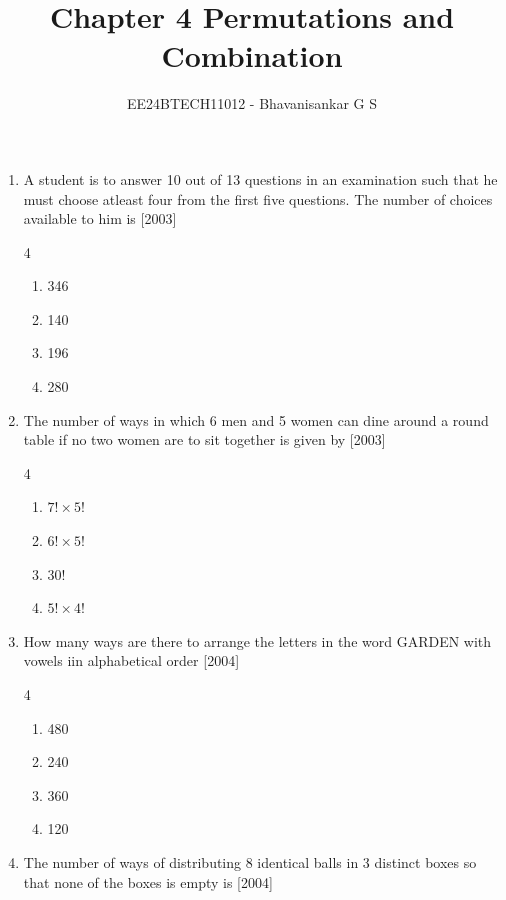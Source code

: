 \documentclass[journal,12pt,twocolumn]{IEEEtran}
\theoremstyle{remark}
\begin{document}

\vspace{3cm}

\title{Chapter 4 Permutations and Combination}
\author{EE24BTECH11012 - Bhavanisankar G S}
\maketitle
\newpage
\bigskip

\renewcommand{\thefigure}{\theenumi}
\renewcommand{\thetable}{\theenumi}
\begin{enumerate}
	\item A student is to answer 10 out of 13 questions in an examination such that he must choose atleast four from the first five questions. The number of choices available to him is  \hfill[2003]	
       \begin{multicols}{4}		
\begin{enumerate} 
    \item  346
    \item  140 
    \item  196
    \item  280
      \end{enumerate}
      \end{multicols}
\item The number of ways in which 6 men and 5 women can dine around a round table if no two women are to sit together is given by \hfill[2003]
	\begin{multicols}{4}	
 \begin{enumerate}
 \item $7!\times5!$
 \item $6!\times 5!$
 \item $30!$
 \item $5!\times4!$
 \end{enumerate}
	\end{multicols}
\item How many ways are there to arrange the letters in the word GARDEN with vowels iin alphabetical order \hfill[2004]
	\begin{multicols}{4}
		\begin{enumerate}
     \item 480
     \item 240
     \item 360
     \item 120
 \end{enumerate}
	\end{multicols}
\item The number of ways of distributing 8 identical balls in 3 distinct boxes so that none of the boxes is empty is \hfill[2004]

\end{enumerate}
\end{document}
